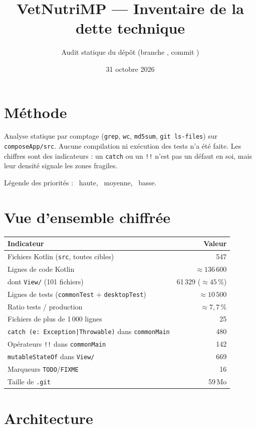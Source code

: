 \documentclass[11pt,a4paper]{article}
\title{VetNutriMP --- Inventaire de la dette technique}
\author{Audit statique du dépôt (branche \code{ccr-757b66d9-sd7476}, commit \code{ef0bc36})}
\date{31 octobre 2026}
\newcommand{\code}[1]{\texttt{#1}}
\newcommand{\prio}[1]{\textbf{\textcolor{#1}{\textbullet}}}
\begin{document}
\maketitle

\section*{Méthode}
Analyse statique par comptage (\code{grep}, \code{wc}, \code{md5sum}, \code{git ls-files}) sur
\code{composeApp/src}. Aucune compilation ni exécution des tests n'a été faite. Les
chiffres sont des indicateurs : un \code{catch} ou un \code{!!} n'est pas un défaut en soi,
mais leur densité signale les zones fragiles.

Légende des priorités : \prio{red!80!black}~haute, \prio{orange}~moyenne, \prio{gray}~basse.

\section{Vue d'ensemble chiffrée}
\begin{center}
\begin{tabular}{lr}
\toprule
Indicateur & Valeur \\
\midrule
Fichiers Kotlin (\code{src}, toutes cibles) & 547 \\
Lignes de code Kotlin & \(\approx 136\,600\) \\
dont \code{View/} (101 fichiers) & 61\,329 (\(\approx 45\,\%\)) \\
Lignes de tests (\code{commonTest} + \code{desktopTest}) & \(\approx 10\,500\) \\
Ratio tests / production & \(\approx 7{,}7\,\%\) \\
Fichiers de plus de 1\,000 lignes & 25 \\
\code{catch (e: Exception|Throwable)} dans \code{commonMain} & 480 \\
Opérateurs \code{!!} dans \code{commonMain} & 142 \\
\code{mutableStateOf} dans \code{View/} & 669 \\
Marqueurs \code{TODO}/\code{FIXME} & 16 \\
Taille de \code{.git} & 59\,Mo \\
\bottomrule
\end{tabular}
\end{center}

\section{Architecture}
\end{document}
